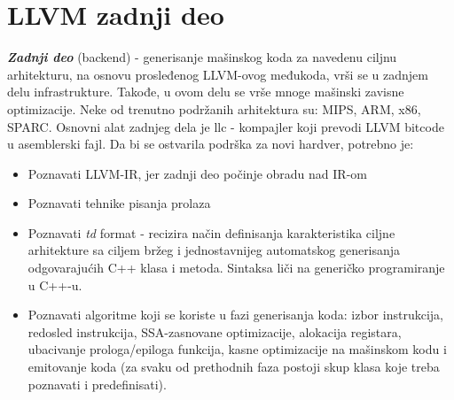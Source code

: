 \documentclass[10pt]{extarticle}
\begin{document}
\section{LLVM zadnji deo}
\noindent
\textit{\textbf{Zadnji deo}} (backend) - generisanje mašinskog koda za navedenu ciljnu arhitekturu, na osnovu prosleđenog LLVM-ovog međukoda, vrši se u zadnjem delu infrastrukture. Takođe, u ovom delu se vrše mnoge mašinski zavisne optimizacije. Neke od trenutno podržanih arhitektura su: MIPS, ARM, x86, SPARC. Osnovni alat zadnjeg dela je llc - kompajler koji prevodi LLVM bitcode u asemblerski fajl. 
Da bi se ostvarila podrška za novi hardver, potrebno je:
\begin{itemize}
    \item Poznavati LLVM-IR, jer zadnji deo počinje obradu nad IR-om
    \item Poznavati tehnike pisanja prolaza
    \item Poznavati \textit{td} format - recizira način definisanja karakteristika ciljne arhitekture sa ciljem bržeg i jednostavnijeg automatskog generisanja odgovarajućih C++ klasa i metoda. Sintaksa liči na generičko programiranje u C++-u.
    \item Poznavati algoritme koji se koriste u fazi generisanja koda: izbor instrukcija, redosled instrukcija, SSA-zasnovane optimizacije, alokacija registara, ubacivanje prologa/epiloga funkcija, kasne optimizacije na mašinskom kodu i emitovanje koda (za svaku od prethodnih faza postoji skup klasa koje treba poznavati i predefinisati).
\end{itemize}
\end{document}
